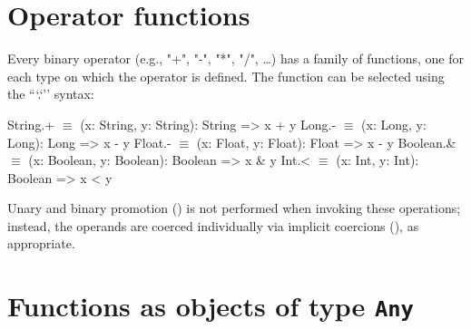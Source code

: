 
\section{Operator functions}
\label{OperatorFunction}
Every binary operator (e.g.,
\xcd"+",
\xcd"-",
\xcd"*",
\xcd"/",
\dots) has a family of functions, one for
each type on which the operator is defined. The function can be
selected using the ``\xcd`.`'' syntax:


\begin{xtenmath}
String.+    $\equiv$ (x: String, y: String): String => x + y
Long.-      $\equiv$ (x: Long, y: Long): Long => x - y
Float.-     $\equiv$ (x: Float, y: Float): Float => x - y
Boolean.&   $\equiv$ (x: Boolean, y: Boolean): Boolean => x & y
Int.<       $\equiv$ (x: Int, y: Int): Boolean => x < y
\end{xtenmath}

\begin{xten}
\end{xten}
%


Unary and binary promotion () is not performed
when invoking these
operations; instead, the operands are coerced individually via implicit
coercions (), as appropriate.


\section{Functions as objects of type {\tt Any}}
\label{FunctionAnyMethods}

